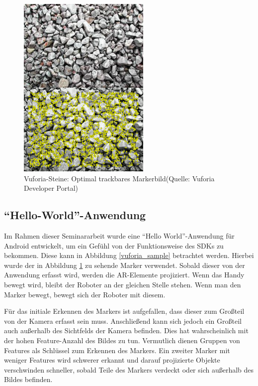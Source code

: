 \begin{figure}[h]
	\centering
	\includegraphics[width=2.5in]{pictures/vuforia_stones_comparison}
	\caption{Vuforia-Steine: Optimal trackbares Markerbild\newline (Quelle: Vuforia Developer Portal)}
	\label{vuforia_stones_image}
\end{figure}

\subsection{"`Hello-World"'-Anwendung}
Im Rahmen dieser Seminararbeit wurde eine "`Hello World"'-Anwendung für Android entwickelt, um ein Gefühl von der Funktionsweise des SDKs zu bekommen. Diese kann in Abbildung \ref{vuforia_sample} betrachtet werden. Hierbei wurde der in Abbildung \ref{vuforia_stones_image} zu sehende Marker verwendet. Sobald dieser von der Anwendung erfasst wird, werden die AR-Elemente projiziert. Wenn das Handy bewegt wird, bleibt der Roboter an der gleichen Stelle stehen. Wenn man den Marker bewegt, bewegt sich der Roboter mit diesem.\par
Für das initiale Erkennen des Markers ist aufgefallen, dass dieser zum Großteil von der Kamera erfasst sein muss. Anschließend kann sich jedoch ein Großteil auch außerhalb des Sichtfelds der Kamera befinden. Dies hat wahrscheinlich mit der hohen Feature-Anzahl des Bildes zu tun. Vermutlich dienen Gruppen von Features als Schlüssel zum Erkennen des Markers. Ein zweiter Marker mit weniger Features wird schwerer erkannt und darauf projizierte Objekte verschwinden schneller, sobald Teile des Markers verdeckt oder sich außerhalb des Bildes befinden.

